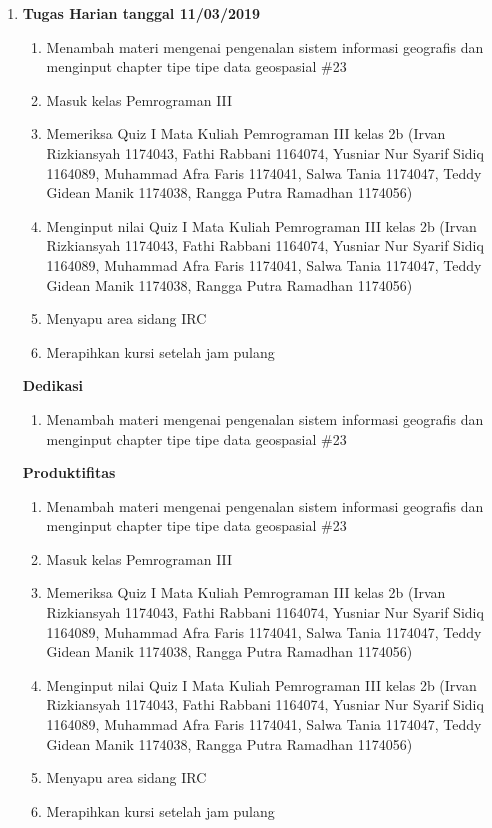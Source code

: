 \begin{enumerate}
\item \textbf{Tugas Harian tanggal 11/03/2019}
\begin{enumerate}
\item Menambah materi mengenai pengenalan sistem informasi geografis dan menginput chapter tipe tipe data geospasial \#23
\item Masuk kelas Pemrograman III
\item Memeriksa Quiz I Mata Kuliah Pemrograman III kelas 2b (Irvan Rizkiansyah 1174043, Fathi Rabbani 1164074, Yusniar Nur Syarif Sidiq 1164089, Muhammad Afra Faris 1174041, Salwa Tania 1174047, Teddy Gidean Manik 1174038, Rangga Putra Ramadhan 1174056)
\item Menginput nilai Quiz I Mata Kuliah Pemrograman III kelas 2b (Irvan Rizkiansyah 1174043, Fathi Rabbani 1164074, Yusniar Nur Syarif Sidiq 1164089, Muhammad Afra Faris 1174041, Salwa Tania 1174047, Teddy Gidean Manik 1174038, Rangga Putra Ramadhan 1174056)
\item Menyapu area sidang IRC
\item Merapihkan kursi setelah jam pulang 
\end{enumerate}

\textbf{Dedikasi}
\begin{enumerate}
\item Menambah materi mengenai pengenalan sistem informasi geografis dan menginput chapter tipe tipe data geospasial \#23
\end{enumerate}

\textbf{Produktifitas}
\begin{enumerate}
\item Menambah materi mengenai pengenalan sistem informasi geografis dan menginput chapter tipe tipe data geospasial \#23
\item Masuk kelas Pemrograman III
\item Memeriksa Quiz I Mata Kuliah Pemrograman III kelas 2b (Irvan Rizkiansyah 1174043, Fathi Rabbani 1164074, Yusniar Nur Syarif Sidiq 1164089, Muhammad Afra Faris 1174041, Salwa Tania 1174047, Teddy Gidean Manik 1174038, Rangga Putra Ramadhan 1174056)
\item Menginput nilai Quiz I Mata Kuliah Pemrograman III kelas 2b (Irvan Rizkiansyah 1174043, Fathi Rabbani 1164074, Yusniar Nur Syarif Sidiq 1164089, Muhammad Afra Faris 1174041, Salwa Tania 1174047, Teddy Gidean Manik 1174038, Rangga Putra Ramadhan 1174056)
\item Menyapu area sidang IRC
\item Merapihkan kursi setelah jam pulang 
\end{enumerate}


\end{enumerate}
